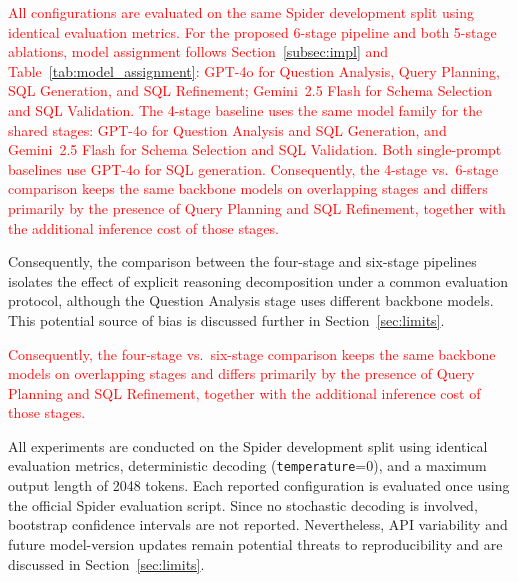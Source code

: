 \documentclass{svproc}
\begin{document}
\textcolor{red}{All configurations are evaluated on the same Spider development split using identical evaluation metrics.
For the proposed 6-stage pipeline and both 5-stage ablations, model assignment follows Section~\ref{subsec:impl} and Table~\ref{tab:model_assignment}: GPT-4o for Question Analysis, Query Planning, SQL Generation, and SQL Refinement; Gemini~2.5 Flash for Schema Selection and SQL Validation.
The 4-stage baseline uses the same model family for the shared stages: GPT-4o for Question Analysis and SQL Generation, and Gemini~2.5 Flash for Schema Selection and SQL Validation.
Both single-prompt baselines use GPT-4o for SQL generation.
Consequently, the 4-stage vs.\ 6-stage comparison keeps the same backbone models on overlapping stages and differs primarily by the presence of Query Planning and SQL Refinement, together with the additional inference cost of those stages.}

Consequently, the comparison between the four-stage and six-stage pipelines isolates the effect of explicit reasoning decomposition under a common evaluation protocol, although the Question Analysis stage uses different backbone models. This potential source of bias is discussed further in Section~\ref{sec:limits}.

\textcolor{red}{Consequently, the four-stage vs.\ six-stage comparison keeps the same backbone models on overlapping stages and differs primarily by the presence of Query Planning and SQL Refinement, together with the additional inference cost of those stages.}

All experiments are conducted on the Spider development split using identical evaluation metrics, deterministic decoding (\texttt{temperature}=0), and a maximum output length of 2048 tokens. Each reported configuration is evaluated once using the official Spider evaluation script. Since no stochastic decoding is involved, bootstrap confidence intervals are not reported. Nevertheless, API variability and future model-version updates remain potential threats to reproducibility and are discussed in Section~\ref{sec:limits}.
\end{document}
